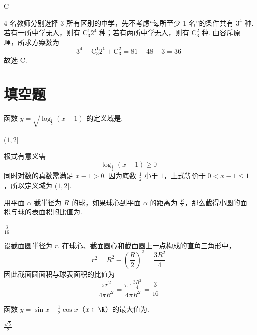 \begin{answer}
C
\end{answer}

\begin{solution}
4 名教师分别选择 3 所有区别的中学，先不考虑“每所至少 1 名”的条件共有 \(3^4\) 种. 若有一所中学无人，则有 \(\mathrm C_3^1 2^4\) 种；若有两所中学无人，则有 \(\mathrm C_3^2\) 种. 由容斥原理，所求方案数为
\[
3^4-\mathrm C_3^1 2^4+\mathrm C_3^2=81-48+3=36
\]
故选 C.
\end{solution}

\section{填空题}
\begin{problem}
函数 \( y = \sqrt{\log_{\frac{1}{2}}(x - 1)} \) 的定义域是\fillinblank{}.
\end{problem}

\begin{answer}
\((1,2]\)
\end{answer}

\begin{solution}
根式有意义需
\[
\log_{\frac12}(x-1)\geqslant0
\]
同时对数的真数需满足 \(x-1>0\). 因为底数 \(\frac12\) 小于 \(1\)，上式等价于 \(0<x-1\leqslant1\)，所以定义域为 \((1,2]\).
\end{solution}

\begin{problem}
用平面 \(\alpha\) 截半径为 \(R\) 的球，如果球心到平面 \(\alpha\) 的距离为 \(\frac{R}{2}\)，那么截得小圆的面积与球的表面积的比值为\fillinblank{}.
\end{problem}

\begin{answer}
\(\frac{3}{16}\)
\end{answer}

\begin{solution}
设截面圆半径为 \(r\). 在球心、截面圆心和截面圆上一点构成的直角三角形中，
\[
r^2=R^2-\left(\frac R2\right)^2=\frac{3R^2}{4}
\]
因此截面圆面积与球表面积的比值为
\[
\frac{\pi r^2}{4\pi R^2}=\frac{\pi\cdot\frac{3R^2}{4}}{4\pi R^2}=\frac{3}{16}
\]
\end{solution}

\begin{problem}
函数 \( y = \sin x - \frac{1}{2}\cos x \)（\(x \in \R\)）的最大值为\fillinblank{}.
\end{problem}

\begin{answer}
\(\frac{\sqrt{5}}{2}\)
\end{answer}


